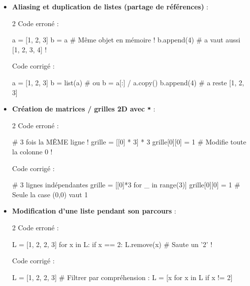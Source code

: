\documentclass[11pt,a4paper]{article}
\begin{document}
\begin{tcolorbox}[left=0cm,title=\bf{\faExclamationTriangle \; 9. Pièges logiques classiques (Aucune exception mais résultat faux !)},colbacktitle=cfond]
\begin{itemize}
	\item[\textbullet] \textbf{Aliasing et duplication de listes (partage de références)} :
	\setlength{\multicolsep}{0pt}
	\begin{multicols}{2}
		\textcolor{BrickRed}{\faTimesCircle \; Code erroné :}
		\begin{python}
a = [1, 2, 3]
b = a # Même objet en mémoire !
b.append(4)
# a vaut aussi [1, 2, 3, 4] !
		\end{python}
		\textcolor{OliveGreen}{\faCheckCircle \; Code corrigé :}
		\begin{python}
a = [1, 2, 3]
b = list(a) # ou b = a[:] / a.copy()
b.append(4)
# a reste [1, 2, 3]
		\end{python}
	\end{multicols}

	\item[\textbullet] \textbf{Création de matrices / grilles 2D avec \texttt{*}} :
	\begin{multicols}{2}
		\textcolor{BrickRed}{\faTimesCircle \; Code erroné :}
		\begin{python}
# 3 fois la MÊME ligne !
grille = [[0] * 3] * 3
grille[0][0] = 1
# Modifie toute la colonne 0 !
		\end{python}
		\textcolor{OliveGreen}{\faCheckCircle \; Code corrigé :}
		\begin{python}
# 3 lignes indépendantes
grille = [[0]*3 for _ in range(3)]
grille[0][0] = 1
# Seule la case (0,0) vaut 1
		\end{python}
	\end{multicols}

	\item[\textbullet] \textbf{Modification d'une liste pendant son parcours} :
	\begin{multicols}{2}
		\textcolor{BrickRed}{\faTimesCircle \; Code erroné :}
		\begin{python}
L = [1, 2, 2, 3]
for x in L:
    if x == 2:
        L.remove(x) # Saute un '2' !
		\end{python}
		\textcolor{OliveGreen}{\faCheckCircle \; Code corrigé :}
		\begin{python}
L = [1, 2, 2, 3]
# Filtrer par compréhension :
L = [x for x in L if x != 2]
		\end{python}
	\end{multicols}


\end{itemize}
\end{tcolorbox}
\end{document}

